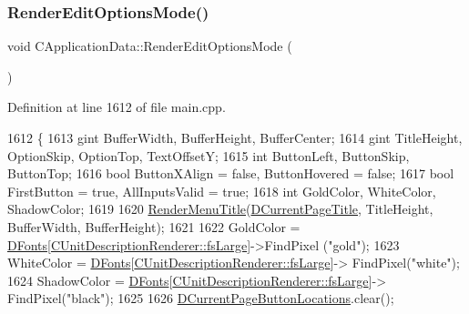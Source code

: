 \subsubsection{\texorpdfstring{Render\+Edit\+Options\+Mode()}{RenderEditOptionsMode()}}
{\footnotesize\ttfamily void C\+Application\+Data\+::\+Render\+Edit\+Options\+Mode (\begin{DoxyParamCaption}{ }\end{DoxyParamCaption})\hspace{0.3cm}{\ttfamily [protected]}}



Definition at line 1612 of file main.\+cpp.


\begin{DoxyCode}
1612                                             \{
1613     gint BufferWidth, BufferHeight, BufferCenter;
1614     gint TitleHeight, OptionSkip, OptionTop, TextOffsetY;
1615     \textcolor{keywordtype}{int} ButtonLeft, ButtonSkip, ButtonTop;
1616     \textcolor{keywordtype}{bool} ButtonXAlign = \textcolor{keyword}{false}, ButtonHovered = \textcolor{keyword}{false};
1617     \textcolor{keywordtype}{bool} FirstButton = \textcolor{keyword}{true}, AllInputsValid = \textcolor{keyword}{true};
1618     \textcolor{keywordtype}{int} GoldColor, WhiteColor, ShadowColor;
1619     
1620     \hyperlink{classCApplicationData_a548c5924a281c7e226fd7cac44e59920}{RenderMenuTitle}(\hyperlink{classCApplicationData_a49ce7f0b5891f0f2c29b73aad636b761}{DCurrentPageTitle}, TitleHeight, BufferWidth, 
      BufferHeight); 
1621     
1622     GoldColor = \hyperlink{classCApplicationData_afde9247d0a3ea87393ec86dcdb1e8274}{DFonts}[\hyperlink{classCUnitDescriptionRenderer_a3ea4cd83b6dd9533ab3abb953a7da35aaf467097fe4f4811a5e2f1959c86e071d}{CUnitDescriptionRenderer::fsLarge}]->FindPixel
      (\textcolor{stringliteral}{"gold"});
1623     WhiteColor = \hyperlink{classCApplicationData_afde9247d0a3ea87393ec86dcdb1e8274}{DFonts}[\hyperlink{classCUnitDescriptionRenderer_a3ea4cd83b6dd9533ab3abb953a7da35aaf467097fe4f4811a5e2f1959c86e071d}{CUnitDescriptionRenderer::fsLarge}]->
      FindPixel(\textcolor{stringliteral}{"white"});
1624     ShadowColor = \hyperlink{classCApplicationData_afde9247d0a3ea87393ec86dcdb1e8274}{DFonts}[\hyperlink{classCUnitDescriptionRenderer_a3ea4cd83b6dd9533ab3abb953a7da35aaf467097fe4f4811a5e2f1959c86e071d}{CUnitDescriptionRenderer::fsLarge}]->
      FindPixel(\textcolor{stringliteral}{"black"});
1625     
1626     \hyperlink{classCApplicationData_a3615df8e23cea3ce17f11cf61340a7b4}{DCurrentPageButtonLocations}.clear();

\end{DoxyCode}
